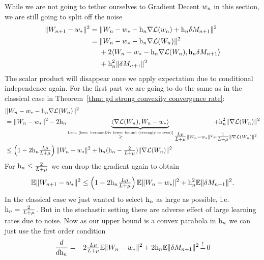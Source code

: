 While we are not going to tether ourselves to Gradient Decent \(w_n\) in
this section, we are still going to split off the noise
\begin{align*}
	\|W_{n+1} - w_*\|^2
	&= \|W_n -w_* - \text{h}_n\nabla\mathcal{L}(w_n) +\text{h}_n \delta M_{n+1}\|^2\\
	&= \begin{aligned}[t]
		&\|W_n - w_* - \text{h}_n\nabla\mathcal{L}(W_n)\|^2\\
		&+ 2\langle W_n - w_* - \text{h}_n\nabla\mathcal{L}(W_n), \text{h}_n \delta M_{n+1}\rangle\\
		&+ \text{h}_n^2 \|\delta M_{n+1}\|^2
	\end{aligned}
\end{align*}
The scalar product will disappear once we apply expectation due to conditional
independence again. For the first part we are going to do the same as in the
classical case in Theorem~\ref{thm: gd strong convexity convergence rate}:
\begin{align*}
	&\|\Weights_n - \weights_* - \lr_n\nabla\Loss(\Weights_n)\|^2\\
	&= \|\Weights_n - \weights_*\|^2
	- 2\lr_n\underbrace{\langle\nabla\Loss(\Weights_n), \Weights_n-\weights_*\rangle}_{
		\xge{\text{Lem.~\ref{lem: bermanDiv lower bound (strongly convex)}}}
	 	\tfrac{\ubound\lbound}{\ubound+\lbound}\|\Weights_n - \minimum\|^2
		\mathrlap{+ \tfrac{1}{\ubound+\lbound}\|\nabla\Loss(\Weights_n)\|^2}
	}
	+ \lr_n^2 \|\nabla\Loss(\Weights_n)\|^2\\
	&\le \left(1-2\lr_n\tfrac{\ubound\lbound}{\ubound+\lbound}\right)
	\|\Weights_n - \weights_*\|^2
	+ \lr_n(\lr_n - \tfrac{2}{\ubound+\lbound})
	\|\nabla\Loss(\Weights_n)\|^2
\end{align*}
For \(\text{h}_n\le\tfrac{2}{L+\mu}\) we can drop the gradient again to
obtain
\begin{align*}
	\mathbb{E}\|W_{n+1} - w_*\|^2
	\le \left(1-2\text{h}_n\tfrac{L\mu}{L+\mu}\right)
	\mathbb{E}\|W_n - w_*\|^2 + \text{h}_n^2 \mathbb{E}\|\delta M_{n+1}\|^2.
\end{align*}
In the classical case we just wanted to select \(\text{h}_n\) as large as possible,
i.e. \(\text{h}_n=\tfrac{2}{L+\mu}\). But in the stochastic setting there
are adverse effect of large learning rates due to noise. Now as our upper bound
is a convex parabola in \(\text{h}_n\) we can just use the first order condition
\begin{align*}
	\frac{d}{d\lr_n}
	= -2\tfrac{\ubound\lbound}{\ubound+\lbound}
	\E\|\Weights_n - \weights_*\|^2 + 2\lr_n \E\|\martIncr_{n+1}\|^2
	\xeq{!} 0
\end{align*}
